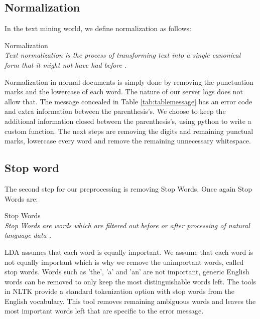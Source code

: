 \subsection{Normalization}\label{methodology:normalization}
In the text mining world, we define normalization as follows: \\

\theoremstyle{definition} 
\begin{definition}{Normalization} 
\\\textit{Text normalization is the process of transforming text into a single canonical form that it might not have had before \cite{Textnorm}.}
\end{definition}

Normalization in normal documents is simply done by removing the punctuation marks and the lowercase of each word. The nature of our server logs does not allow that. The message concealed in Table \ref{tab:tablemessage} has an error code and extra information between the parenthesis's. We choose to keep the additional information closed between the parenthesis's, using python to write a custom function. The next steps are removing the digits and remaining punctual marks, lowercase every word and remove the remaining unnecessary whitespace. 

\subsection{Stop word}\label{methodology:stop_words}
The second step for our preprocessing is removing Stop Words. Once again Stop Words are:

\theoremstyle{definition} 
\begin{definition}{Stop Words} 
\\\textit{Stop Words are words which are filtered out before or after processing of natural language data \cite{Anand2011}.}
\end{definition}

LDA assumes that each word is equally important. We assume that each word is not equally important which is why we remove the unimportant words, called stop words. Words such as 'the', 'a' and 'an' are not important, generic English words can be removed to only keep the most distinguishable words left. 
The tools in NLTK provide a standard tokenization option with stop words from the English vocabulary. This tool removes remaining ambiguous words and leaves the most important words left that are specific to the error message. 

